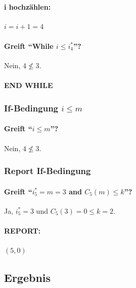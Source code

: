 \paragraph{i hochzählen:} $i = i + 1 = 4$


\paragraph{Greift ``While $i \le i_{4}^\ast$''?} Nein, $4 \not\le 3$.

\paragraph{END WHILE}

\subsubsection*{If-Bedingung $i\le m$}

\paragraph{Greift ``$i\le m$''?} Nein, $4 \not\leq 3$.

\subsubsection*{Report If-Bedingung}

\paragraph{Greift ``$i^*_5 = m = 3$ and $C_5(m) \leq k$''?} Ja, $i^*_5 = 3$ und $C_5(3) = 0 \leq k = 2$.

\paragraph{REPORT:} $(5, 0)$

\subsection*{Ergebnis}

